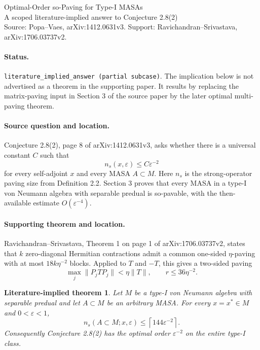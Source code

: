 \documentclass[11pt]{article}
\newtheorem*{theorem}{Literature-implied theorem}
\begin{document}
\begin{center}
{\Large Optimal-Order so-Paving for Type-I MASAs}\\[0.45em]
{\normalsize A scoped literature-implied answer to Conjecture 2.8(2)}\\[0.3em]
{\small Source: Popa--Vaes, arXiv:1412.0631v3.\quad
Support: Ravichandran--Srivastava, arXiv:1706.03737v2.}
\end{center}

\paragraph{Status.}
\texttt{literature\_implied\_answer (partial subcase)}.  The implication below
is not advertised as a theorem in the supporting paper.  It results by replacing
the matrix-paving input in Section 3 of the source paper by the later optimal
multi-paving theorem.

\paragraph{Source question and location.}
Conjecture 2.8(2), page 8 of arXiv:1412.0631v3, asks whether there is a universal
constant $C$ such that
\[
  n_s(x,\varepsilon)\le C\varepsilon^{-2}
\]
for every self-adjoint $x$ and every MASA $A\subset M$.  Here $n_s$ is the
strong-operator paving size from Definition 2.2.  Section 3 proves that every
MASA in a type-I von Neumann algebra with separable predual is so-pavable, with
the then-available estimate $O(\varepsilon^{-4})$.

\paragraph{Supporting theorem and location.}
Ravichandran--Srivastava, Theorem 1 on page 1 of arXiv:1706.03737v2, states
that $k$ zero-diagonal Hermitian contractions admit a common one-sided
$\eta$-paving with at most $18k\eta^{-2}$ blocks.  Applied to $T$ and $-T$,
this gives a two-sided paving
\[
  \max_j\|P_jTP_j\|<\eta\|T\|,
  \qquad r\le 36\eta^{-2}.                                      \tag{1}
\]

\begin{theorem}
Let $M$ be a type-I von Neumann algebra with separable predual and let
$A\subset M$ be an arbitrary MASA.  For every $x=x^*\in M$ and
$0<\varepsilon<1$,
\[
  n_s(A\subset M;x,\varepsilon)
  \le \left\lceil 144\varepsilon^{-2}\right\rceil .             \tag{2}
\]
Consequently Conjecture 2.8(2) has the optimal order $\varepsilon^{-2}$ on
the entire type-I class.
\end{theorem}
\end{document}
